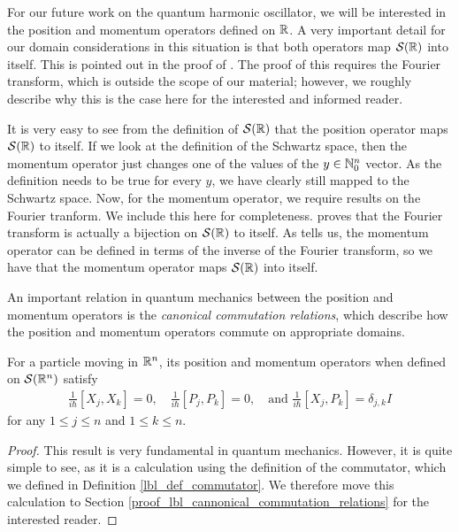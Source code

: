 \begin{remark}\label{lbl_position_momentum_map_SR_to_SR}
  For our future work on the quantum harmonic oscillator, we will be interested in the position and momentum operators defined on $\mathcal{\mathbb{R}}$. A very important detail for our domain considerations in this situation is that both operators map $\mathcal{S}(\mathbb{R})$ into itself. This is pointed out in the proof of {\cite[Theorem 11.4, p.236]{Hall2013}}. The proof of this requires the Fourier transform, which is outside the scope of our material; however, we roughly describe why this is the case here for the interested and informed reader.

  \medskip

  It is very easy to see from the definition of $\mathcal{S}(\mathbb{R})$ that the position operator maps $\mathcal{S}(\mathbb{R})$ to itself. If we look at the definition of the Schwartz space, then the momentum operator just changes one of the values of the $y \in \mathbb{N}_0^n$ vector. As the definition needs to be true for every $y$, we have clearly still mapped to the Schwartz space.  Now, for the momentum operator, we require results on the Fourier tranform. We include this here for completeness. {\cite[Theorem 7.4]{teschl}} proves that the Fourier transform is actually a bijection on $\mathcal{S}(\mathbb{R})$ to itself. As {\cite[Proposition 9.32]{Hall2013}} tells us, the momentum operator can be defined in terms of the inverse of the Fourier transform, so we have that the momentum operator maps $\mathcal{S}(\mathbb{R})$ into itself.
\end{remark}

An important relation in quantum mechanics between the position and momentum operators is the {\emph{canonical commutation relations}}, which describe how the position and momentum operators commute on appropriate domains.

\begin{proposition}
\label{lbl_cannonical_commutation_relations}
  For a particle moving in $\mathbb{R}^n$, its position and momentum operators when defined on $\mathcal{S}(\mathbb{R}^n)$ satisfy
  \begin{align*}
    \frac{1}{i\hbar}[X_j, X_k] = 0, \quad
    \frac{1}{i\hbar}[P_j, P_k] = 0, \quad \text{and}\,\,
    \frac{1}{i\hbar}[X_j, P_k] = \delta_{j,k} I
  \end{align*}
  for any $1 \leq j \leq n$ and $1 \leq k \leq n$.
\end{proposition}
\begin{proof}
  This result is very fundamental in quantum mechanics. However, it is quite simple to see, as it is a calculation using the definition of the commutator, which we defined in Definition \eqref{lbl_def_commutator}. We therefore move this calculation to Section \eqref{proof_lbl_cannonical_commutation_relations} for the interested reader.
\end{proof}

